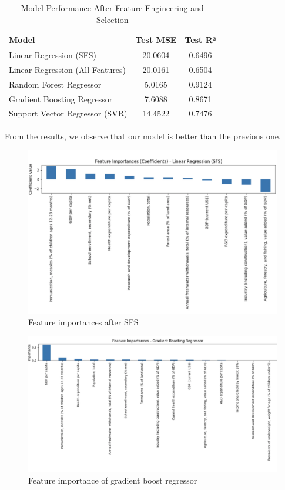 \documentclass{article}
\begin{document}
\begin{table}[h]
    \centering
    \caption{Model Performance After Feature Engineering and Selection}
    \label{tab:model_performance_improved}
    \begin{tabular}{|l|c|c|}
        \hline
        \textbf{Model} & \textbf{Test MSE} & \textbf{Test R²} \\
        \hline
        Linear Regression (SFS) & 20.0604 & 0.6496 \\
        Linear Regression (All Features) & 20.0161 & 0.6504 \\
        Random Forest Regressor & 5.0165 & 0.9124 \\
        Gradient Boosting Regressor & 7.6088 & 0.8671 \\
        Support Vector Regressor (SVR) & 14.4522 & 0.7476 \\
        \hline
    \end{tabular}
\end{table}

From the results, we observe that our model is better than the previous one.

\begin{figure}[h]
    \centering
    \includegraphics[width=0.8\columnwidth]{./pic/T1.c.3.png} %
    \caption{Feature importances after SFS}
    \label{fig:correlation_heatmap1}
\end{figure}
\begin{figure}[h]
    \centering
    \includegraphics[width=0.8\columnwidth]{./pic/T1.c.4.png} %
    \caption{Feature importance of gradient boost regressor}
    \label{fig:correlation_heatmap2}
\end{figure}
\end{document}
